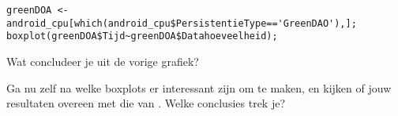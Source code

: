 \begin{lstlisting}
greenDOA <- android_cpu[which(android_cpu$PersistentieType=='GreenDAO'),];
boxplot(greenDOA$Tijd~greenDOA$Datahoeveelheid);
\end{lstlisting}

\begin{exercise}
	Wat concludeer je uit de vorige grafiek?
\end{exercise}

\begin{exercise}
	Ga nu zelf na welke boxplots er interessant zijn om te maken, en kijken of jouw resultaten overeen met die van \textcite{Akin2016}. Welke conclusies trek je?
\end{exercise}



